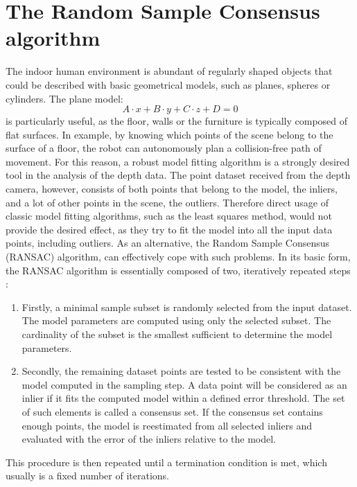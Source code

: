 \section{The Random Sample Consensus algorithm}
\label{sec:ransac}
The indoor human environment is abundant of regularly shaped objects that could be described with basic geometrical models, such as planes, spheres or cylinders. The plane model:
\begin{equation}
A \cdot x+ B \cdot y+ C \cdot z+ D= 0
\label{eq:planemodel}
\end{equation}
is particularly useful, as the floor, walls or the furniture is typically composed of flat surfaces. In example, by knowing which points of the scene belong to the surface of a floor, the robot can autonomously plan a collision-free path of movement. For this reason, a robust model fitting algorithm is a strongly desired tool in the analysis of the depth data. The point dataset received from the depth camera, however, consists of both points that belong to the model, the inliers, and a lot of other points in the scene, the outliers. Therefore direct usage of classic model fitting algorithms, such as the least squares method, would not provide the desired effect, as they try to fit the model into all the input data points, including outliers. As an alternative, the Random Sample Consensus (RANSAC) algorithm, can effectively cope with such problems. In its basic form, the RANSAC algorithm is essentially composed of two, iteratively repeated steps \cite{wikipedia,ransacdummies}:
\begin{enumerate}
\item Firstly, a minimal sample subset is randomly selected from the input dataset. The model parameters are computed using only the selected subset. The cardinality of the subset is the smallest sufficient to determine the model parameters.
\item Secondly, the remaining dataset points are tested to be consistent with the model computed in the sampling step. A data point will be considered as an inlier if it fits the computed model within a defined error threshold. The set of such elements is called a consensus set. If the consensus set contains enough points, the model is reestimated from all selected inliers and evaluated with the error of the inliers relative to the model.
\end{enumerate}
This procedure is then repeated until a termination condition is met, which usually is a fixed number of iterations.
